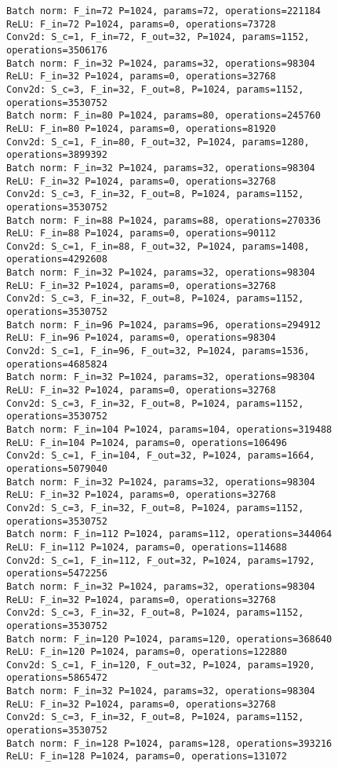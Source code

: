 \begin{Verbatim}[fontsize=\small]
Batch norm: F_in=72 P=1024, params=72, operations=221184
ReLU: F_in=72 P=1024, params=0, operations=73728
Conv2d: S_c=1, F_in=72, F_out=32, P=1024, params=1152, operations=3506176
Batch norm: F_in=32 P=1024, params=32, operations=98304
ReLU: F_in=32 P=1024, params=0, operations=32768
Conv2d: S_c=3, F_in=32, F_out=8, P=1024, params=1152, operations=3530752
Batch norm: F_in=80 P=1024, params=80, operations=245760
ReLU: F_in=80 P=1024, params=0, operations=81920
Conv2d: S_c=1, F_in=80, F_out=32, P=1024, params=1280, operations=3899392
Batch norm: F_in=32 P=1024, params=32, operations=98304
ReLU: F_in=32 P=1024, params=0, operations=32768
Conv2d: S_c=3, F_in=32, F_out=8, P=1024, params=1152, operations=3530752
Batch norm: F_in=88 P=1024, params=88, operations=270336
ReLU: F_in=88 P=1024, params=0, operations=90112
Conv2d: S_c=1, F_in=88, F_out=32, P=1024, params=1408, operations=4292608
Batch norm: F_in=32 P=1024, params=32, operations=98304
ReLU: F_in=32 P=1024, params=0, operations=32768
Conv2d: S_c=3, F_in=32, F_out=8, P=1024, params=1152, operations=3530752
Batch norm: F_in=96 P=1024, params=96, operations=294912
ReLU: F_in=96 P=1024, params=0, operations=98304
Conv2d: S_c=1, F_in=96, F_out=32, P=1024, params=1536, operations=4685824
Batch norm: F_in=32 P=1024, params=32, operations=98304
ReLU: F_in=32 P=1024, params=0, operations=32768
Conv2d: S_c=3, F_in=32, F_out=8, P=1024, params=1152, operations=3530752
Batch norm: F_in=104 P=1024, params=104, operations=319488
ReLU: F_in=104 P=1024, params=0, operations=106496
Conv2d: S_c=1, F_in=104, F_out=32, P=1024, params=1664, operations=5079040
Batch norm: F_in=32 P=1024, params=32, operations=98304
ReLU: F_in=32 P=1024, params=0, operations=32768
Conv2d: S_c=3, F_in=32, F_out=8, P=1024, params=1152, operations=3530752
Batch norm: F_in=112 P=1024, params=112, operations=344064
ReLU: F_in=112 P=1024, params=0, operations=114688
Conv2d: S_c=1, F_in=112, F_out=32, P=1024, params=1792, operations=5472256
Batch norm: F_in=32 P=1024, params=32, operations=98304
ReLU: F_in=32 P=1024, params=0, operations=32768
Conv2d: S_c=3, F_in=32, F_out=8, P=1024, params=1152, operations=3530752
Batch norm: F_in=120 P=1024, params=120, operations=368640
ReLU: F_in=120 P=1024, params=0, operations=122880
Conv2d: S_c=1, F_in=120, F_out=32, P=1024, params=1920, operations=5865472
Batch norm: F_in=32 P=1024, params=32, operations=98304
ReLU: F_in=32 P=1024, params=0, operations=32768
Conv2d: S_c=3, F_in=32, F_out=8, P=1024, params=1152, operations=3530752
Batch norm: F_in=128 P=1024, params=128, operations=393216
ReLU: F_in=128 P=1024, params=0, operations=131072

\end{Verbatim}
